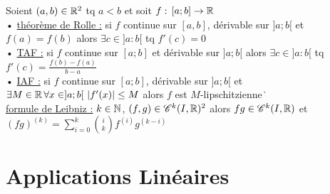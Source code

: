 \documentclass[12 pt]{exampleclass}
\begin{document}
\begin{flushleft}
\begin{doublespace}
	Soient $(a,b)\in \mathbb{R}^2$ tq $a<b$ et soit $f : \, [a ; b] \rightarrow \mathbb{R}$\\
	• \underline{théorème de Rolle :} si $f$ continue sur $[a , b]$, dérivable sur $]a ; b[$ et $f(a) = f(b)$ alors $\exists c\in ]a : b[$ tq $f'(c) = 0$\\
	• \underline{TAF :} si $f$ continue sur $[a ; b]$ et dérivable sur $]a ; b[$ alors $\exists c\in ]a : b[$ tq $f'(c) = \frac{f(b) - f(a)}{b - a}$\\
	• \underline{IAF :} si $f$ continue sur $[a ; b]$, dérivable sur $]a ; b[$ et $\exists M \in \R \, \forall x\in ]a ; b[ \ |f'(x)|\leq M$ alors $f$ est $M$-lipschitzienne\.\
	\text{ }\\
	\underline{formule de Leibniz :} $k\in\mathbb{N}$, $(f,g)\in \mathscr{C}^k(I,\mathbb{R})^2$ alors $fg\in \mathscr{C}^k(I,\mathbb{R})$ et $(fg)^{(k)} = \sum_{i = 0}^k \binom{i}{k} f^{(i)} g^{(k - i)}$\\

\end{doublespace}
\end{flushleft}

\section{Applications Linéaires}
\end{document}
